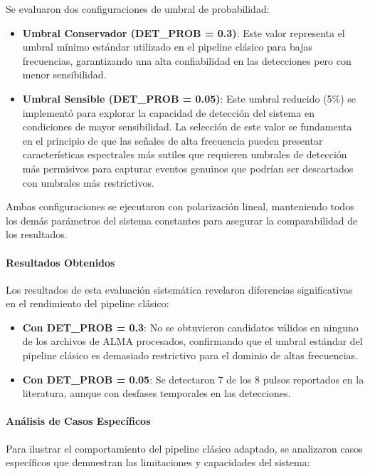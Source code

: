 Se evaluaron dos configuraciones de umbral de probabilidad:

\begin{itemize}
    \item \textbf{Umbral Conservador (DET\_PROB = 0.3)}: Este valor representa el umbral mínimo estándar utilizado en el pipeline clásico para bajas frecuencias, garantizando una alta confiabilidad en las detecciones pero con menor sensibilidad.
    \item \textbf{Umbral Sensible (DET\_PROB = 0.05)}: Este umbral reducido (5\%) se implementó para explorar la capacidad de detección del sistema en condiciones de mayor sensibilidad. La selección de este valor se fundamenta en el principio de que las señales de alta frecuencia pueden presentar características espectrales más sutiles que requieren umbrales de detección más permisivos para capturar eventos genuinos que podrían ser descartados con umbrales más restrictivos.
\end{itemize}

Ambas configuraciones se ejecutaron con polarización lineal, manteniendo todos los demás parámetros del sistema constantes para asegurar la comparabilidad de los resultados.

\paragraph{Resultados Obtenidos}

Los resultados de esta evaluación sistemática revelaron diferencias significativas en el rendimiento del pipeline clásico:

\begin{itemize}
    \item \textbf{Con DET\_PROB = 0.3}: No se obtuvieron candidatos válidos en ninguno de los archivos de ALMA procesados, confirmando que el umbral estándar del pipeline clásico es demasiado restrictivo para el dominio de altas frecuencias.
    \item \textbf{Con DET\_PROB = 0.05}: Se detectaron 7 de los 8 pulsos reportados en la literatura, aunque con desfases temporales en las detecciones.
\end{itemize}

\paragraph{Análisis de Casos Específicos}

Para ilustrar el comportamiento del pipeline clásico adaptado, se analizaron casos específicos que demuestran las limitaciones y capacidades del sistema:

